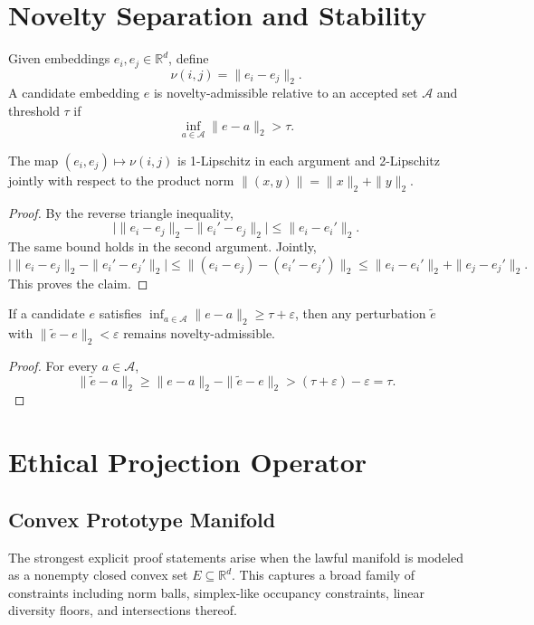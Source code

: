 \documentclass[11pt]{article}
\begin{document}
\section{Novelty Separation and Stability}
\begin{definition}
Given embeddings \(e_i,e_j \in \mathbb{R}^d\), define
\[
\nu(i,j) = \|e_i - e_j\|_2. \tag{A2}
\]
A candidate embedding \(e\) is novelty-admissible relative to an accepted set \(\mathcal{A}\) and threshold \(\tau\) if
\[
\inf_{a \in \mathcal{A}} \|e-a\|_2 > \tau. \tag{A3}
\]
\end{definition}

\begin{proposition}
The map \((e_i,e_j) \mapsto \nu(i,j)\) is 1-Lipschitz in each argument and 2-Lipschitz jointly with respect to the product norm \(\|(x,y)\| = \|x\|_2 + \|y\|_2\).
\end{proposition}

\begin{proof}
By the reverse triangle inequality,
\[
\big|\|e_i-e_j\|_2 - \|e_i'-e_j\|_2\big| \le \|e_i-e_i'\|_2. \tag{A4}
\]
The same bound holds in the second argument. Jointly,
\[
\big|\|e_i-e_j\|_2 - \|e_i'-e_j'\|_2\big|
\le \|(e_i-e_j)-(e_i'-e_j')\|_2
\le \|e_i-e_i'\|_2 + \|e_j-e_j'\|_2. \tag{A5}
\]
This proves the claim.
\end{proof}

\begin{corollary}
If a candidate \(e\) satisfies \(\inf_{a \in \mathcal{A}} \|e-a\|_2 \ge \tau + \varepsilon\), then any perturbation \(\tilde e\) with \(\|\tilde e - e\|_2 < \varepsilon\) remains novelty-admissible.
\end{corollary}

\begin{proof}
For every \(a \in \mathcal{A}\),
\[
\|\tilde e-a\|_2 \ge \|e-a\|_2 - \|\tilde e-e\|_2 > (\tau+\varepsilon)-\varepsilon = \tau. \tag{A6}
\]
\end{proof}

\section{Ethical Projection Operator}
\subsection{Convex Prototype Manifold}
The strongest explicit proof statements arise when the lawful manifold is modeled as a nonempty closed convex set \(E \subseteq \mathbb{R}^d\). This captures a broad family of constraints including norm balls, simplex-like occupancy constraints, linear diversity floors, and intersections thereof.
\end{document}
